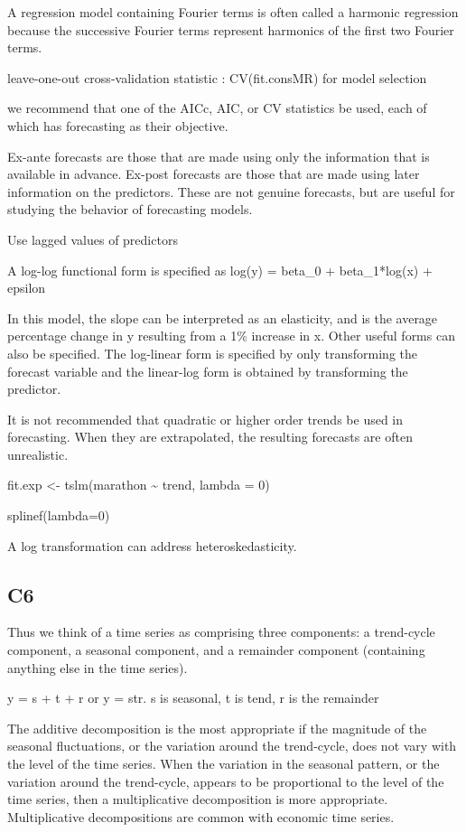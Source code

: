 \documentclass[]{book}
\begin{document}
A regression model containing Fourier terms is often called a harmonic
regression because the successive Fourier terms represent harmonics of
the first two Fourier terms.

leave-one-out cross-validation statistic : CV(fit.consMR) for model
selection

we recommend that one of the AICc, AIC, or CV statistics be used, each
of which has forecasting as their objective.

Ex-ante forecasts are those that are made using only the information
that is available in advance. Ex-post forecasts are those that are made
using later information on the predictors. These are not genuine
forecasts, but are useful for studying the behavior of forecasting
models.

Use lagged values of predictors

A log-log functional form is specified as log(y) = beta\_0 +
beta\_1*log(x) + epsilon

In this model, the slope can be interpreted as an elasticity, and is the
average percentage change in y resulting from a 1\% increase in x. Other
useful forms can also be specified. The log-linear form is specified by
only transforming the forecast variable and the linear-log form is
obtained by transforming the predictor.

It is not recommended that quadratic or higher order trends be used in
forecasting. When they are extrapolated, the resulting forecasts are
often unrealistic.

fit.exp \textless{}- tslm(marathon \textasciitilde{} trend, lambda = 0)

splinef(lambda=0)

A log transformation can address heteroskedasticity.

\subsection{C6}\label{c6}

Thus we think of a time series as comprising three components: a
trend-cycle component, a seasonal component, and a remainder component
(containing anything else in the time series).

y = s + t + r or y = str. s is seasonal, t is tend, r is the remainder

The additive decomposition is the most appropriate if the magnitude of
the seasonal fluctuations, or the variation around the trend-cycle, does
not vary with the level of the time series. When the variation in the
seasonal pattern, or the variation around the trend-cycle, appears to be
proportional to the level of the time series, then a multiplicative
decomposition is more appropriate. Multiplicative decompositions are
common with economic time series.
\end{document}
